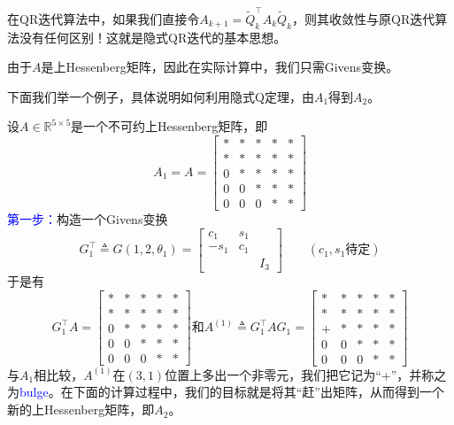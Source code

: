 \documentclass[12pt,a4paper]{article}
\begin{document}
在QR迭代算法中，如果我们直接令$A_{k+1}=\tilde{Q}_{k}^{\top} A_{k} \tilde{Q}_{k}$，则其收敛性与原QR迭代算法没有任何区别！这就是隐式QR迭代的基本思想。

由于$A$是上Hessenberg矩阵，因此在实际计算中，我们只需Givens变换。

下面我们举一个例子，具体说明如何利用隐式Q定理，由$A_1$得到$A_2$。

设$A \in \mathbb{R}^{5 \times 5}$是一个不可约上Hessenberg矩阵，即$$
A_{1}=A=\left[\begin{array}{ccccc}{*} & {*} & {*}& {*}& {*} \\ {*} & {*} & {*}& {*}& {*} \\ {0} & {*} & {*}& {*}& {*} \\ {0} & {0} & {*} & {*}& {*} \\ {0} & {0} & {0} & {*}& {*}\end{array}\right]
$$
\textcolor{blue}{第一步：}\quad 构造一个Givens变换
$$
G_{1}^{\top} \triangleq G\left(1,2, \theta_{1}\right)=\left[\begin{array}{ccc}{c_{1}} & {s_{1}}& \\ {-s_{1}} & {c_{1}} &\\ {} && {I_{3}}\end{array}\right]
\qquad (c_1,s_1\text{待定})
$$
于是有$$
G_{1}^{\top} A=\left[\begin{array}{ccccc}{*}  & {*} & {*}& {*}& {*}\\ {*} & {*} & {*} & {*}& {*}\\ {0} & {*} & {*}& {*}& {*} \\ {0} & {0} & {*} & {*}& {*}\\ {0} & {0} & {0} & { *}& {*}\end{array}\right] \text{和}A^{(1)} \triangleq G_{1}^{\top} A G_{1}=\left[\begin{array}{ccccc}{*}  & {*} & {*}& {*} & {*} \\ {*}  & {*} & {*}& {*} & {*} \\ {+} & {*} & {*}  & {*} & {*}\\ {0} & {0} & {*} & {*}  & {*}\\ {0} & {0} & {0} & {*} & {*}\end{array}\right]
$$
与$A_1$相比较，$A^{(1)}$在$(3,1)$位置上多出一个非零元，我们把它记为“+”，并称之为\textcolor{blue}{bulge}。在下面的计算过程中，我们的目标就是将其“赶”出矩阵，从而得到一个新的上Hessenberg矩阵，即$A_2$。
\end{document}
